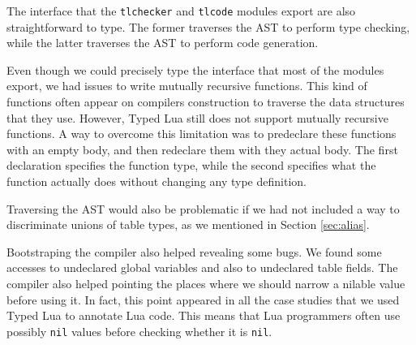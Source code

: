 The interface that the \texttt{tlchecker} and \texttt{tlcode}
modules export are also straightforward to type.
The former traverses the AST to perform type checking,
while the latter traverses the AST to perform code generation.

Even though we could precisely type the interface that most of
the modules export, we had issues to write mutually recursive functions.
This kind of functions often appear on compilers construction
to traverse the data structures that they use.
However, Typed Lua still does not support mutually recursive functions.
A way to overcome this limitation was to predeclare these functions
with an empty body, and then redeclare them with they actual body.
The first declaration specifies the function type, while the
second specifies what the function actually does without changing
any type definition.

Traversing the AST would also be problematic if we had not included
a way to discriminate unions of table types, as we mentioned in Section \ref{sec:alias}.

Bootstraping the compiler also helped revealing some bugs.
We found some accesses to undeclared global variables and also
to undeclared table fields.
The compiler also helped pointing the places where we should narrow
a nilable value before using it.
In fact, this point appeared in all the case studies that we used
Typed Lua to annotate Lua code.
This means that Lua programmers often use possibly \texttt{nil} values
before checking whether it is \texttt{nil}.

